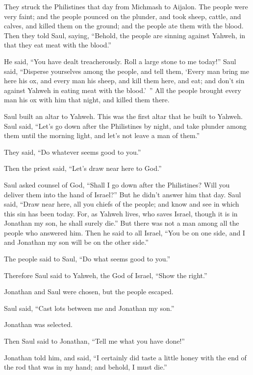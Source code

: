 {They struck the Philistines that day from Michmash to Aijalon. The people were very faint;
and the people pounced on the plunder, and took sheep, cattle, and calves, and killed them on the ground; and the people ate them with the blood.
Then they told Saul, saying, “Behold, the people are sinning against Yahweh, in that they eat meat with the blood.”
\par }{\PP He said, “You have dealt treacherously. Roll a large stone to me today!”
Saul said, “Disperse yourselves among the people, and tell them, ‘Every man bring me here his ox, and every man his sheep, and kill them here, and eat; and don’t sin against Yahweh in eating meat with the blood.’ ” All the people brought every man his ox with him that night, and killed them there.
\par }{\PP {}Saul built an altar to Yahweh. This was the first altar that he built to Yahweh.
Saul said, “Let’s go down after the Philistines by night, and take plunder among them until the morning light, and let’s not leave a man of them.”
\par }{\PP They said, “Do whatever seems good to you.”
\par }{\PP Then the priest said, “Let’s draw near here to God.”
\par }{\PP {}Saul asked counsel of God, “Shall I go down after the Philistines? Will you deliver them into the hand of Israel?” But he didn’t answer him that day.
Saul said, “Draw near here, all you chiefs of the people; and know and see in which this sin has been today.
For, as Yahweh lives, who saves Israel, though it is in Jonathan my son, he shall surely die.” But there was not a man among all the people who answered him.
Then he said to all Israel, “You be on one side, and I and Jonathan my son will be on the other side.”
\par }{\PP The people said to Saul, “Do what seems good to you.”
\par }{\PP {}Therefore Saul said to Yahweh, the God of Israel, “Show the right.”
\par }{\PP Jonathan and Saul were chosen, but the people escaped.
\par }{\PP {}Saul said, “Cast lots between me and Jonathan my son.”
\par }{\PP Jonathan was selected.
\par }{\PP {}Then Saul said to Jonathan, “Tell me what you have done!”
\par }{\PP Jonathan told him, and said, “I certainly did taste a little honey with the end of the rod that was in my hand; and behold, I must die.”
}
